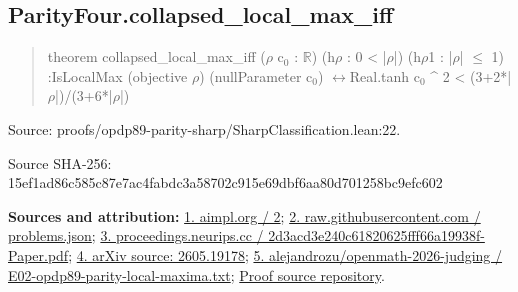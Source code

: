 \documentclass[11pt,a4paper]{article}
\begin{document}
\begin{samepage}
\subsection{ParityFour.collapsed\_local\_max\_iff}
\begin{quote}\small\ttfamily theorem collapsed\_local\_max\_iff (\ensuremath{\rho} c\ensuremath{_0} : \ensuremath{\mathbb{R}}) (h\ensuremath{\rho} : 0 < |\ensuremath{\rho}|) (h\ensuremath{\rho}1 : |\ensuremath{\rho}| \ensuremath{\leq} 1) :\newline     IsLocalMax (objective \ensuremath{\rho}) (nullParameter c\ensuremath{_0}) \ensuremath{\leftrightarrow}\newline       Real.tanh c\ensuremath{_0} \textasciicircum{} 2 < (3+2*|\ensuremath{\rho}|)/(3+6*|\ensuremath{\rho}|)\end{quote}
{\small Source: proofs/opdp89-parity-sharp/SharpClassification.lean:22.\par}

{\small Source SHA-256: 15ef1ad86c585c87e7ac4fabdc3a58702c915e69dbf6aa80d701258bc9efc602\par}

{\small\textbf{Sources and attribution:} \href{http://aimpl.org/boltzmann/2/}{1. aimpl.org / 2}; \href{https://raw.githubusercontent.com/alejandrozu/opdp-week-math-100/main/data/problems.json}{2. raw.githubusercontent.com / problems.json}; \href{https://proceedings.neurips.cc/paper_files/paper/2002/file/2d3acd3e240c61820625fff66a19938f-Paper.pdf}{3. proceedings.neurips.cc / 2d3acd3e240c61820625fff66a19938f-Paper.pdf}; \href{https://arxiv.org/html/2605.19178}{4. arXiv source: 2605.19178}; \href{https://github.com/alejandrozu/openmath-2026-judging/blob/d0ed487f487fa7ec814ff705ab55249983fe8707/OpenMath-Judging/review/entries/E02-opdp89-parity-local-maxima.txt}{5. alejandrozu/openmath-2026-judging / E02-opdp89-parity-local-maxima.txt}; \href{https://github.com/alejandrozu/openmath-2026-judging}{Proof source repository}.\par}

\end{samepage}
\end{document}
